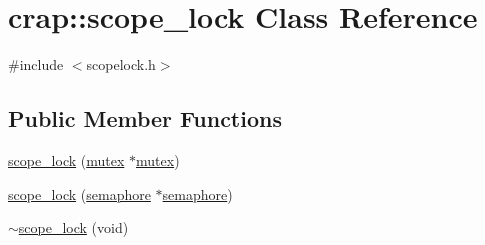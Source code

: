 \hypertarget{classcrap_1_1scope__lock}{\section{crap\-:\-:scope\-\_\-lock Class Reference}
\label{classcrap_1_1scope__lock}
}


{\ttfamily \#include $<$scopelock.\-h$>$}

\subsection*{Public Member Functions}
\begin{DoxyCompactItemize}
\item 
\hyperlink{classcrap_1_1scope__lock_a4062ccee292ae1facbc3c09611168429}{scope\-\_\-lock} (\hyperlink{classcrap_1_1mutex}{mutex} $\ast$\hyperlink{classcrap_1_1mutex}{mutex})
\item 
\hyperlink{classcrap_1_1scope__lock_a96f02021dff94c467dc39762831415cb}{scope\-\_\-lock} (\hyperlink{classcrap_1_1semaphore}{semaphore} $\ast$\hyperlink{classcrap_1_1semaphore}{semaphore})
\item 
\hyperlink{classcrap_1_1scope__lock_a3bd9a34cdd41724e5ee7a29c0dcbbdaa}{$\sim$scope\-\_\-lock} (void)
\end{DoxyCompactItemize}


